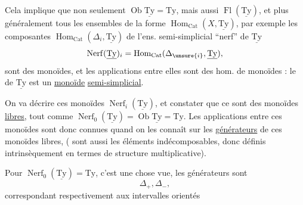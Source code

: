 

Cela implique que non seulement $\operatorname{Ob}\underline{\mathrm{Ty}}=\mathrm{Ty}$, mais aussi $\operatorname{Fl}(\underline{\mathrm{Ty}})$, et plus généralement tous les ensembles  de la forme $\operatorname{Hom}_{\mathrm{Cat}}(X,\underline{\mathrm{Ty}})$,  par exemple les composantes $\operatorname{Hom}_{\mathrm{Cat}}(\Delta_i,\underline{\mathrm{Ty}})$ de l'ens. semi-simplicial ``nerf'' de $\underline{\mathrm{Ty}}$
\[
\operatorname{Nerf}(\underline{\mathrm{Ty}})_i=\operatorname{Hom}_{\mathrm{Cat}}(\Delta_{\unsure{i}},\underline{\mathrm{Ty}}),
\]
sont des monoïdes, et les applications  entre elles sont des hom. de monoïdes : le   de $\underline{\mathrm{Ty}}$ est un \uline{monoïde} \uline{semi-simplicial}.

On va décrire ces monoïdes $\operatorname{Nerf}_i(\underline{\mathrm{Ty}})$, et constater que ce sont  des monoïdes \uline{libres},   tout comme $\operatorname{Nerf}_0(\underline{\mathrm{Ty}})=\operatorname{Ob}\underline{\mathrm{Ty}}=\mathrm{Ty}$. Les applications  entre ces monoïdes sont donc connues quand on les connaît sur les \uline{générateurs} de ces monoïdes libres, ( sont aussi les éléments indécomposables, donc définis intrinsèquement en termes de  structure multiplicative).

Pour $\operatorname{Nerf}_0(\underline{\mathrm{Ty}})=\mathrm{Ty}$, c'est une chose vue, les générateurs sont
\[
\Delta_+,\Delta_-,
\]
correspondant respectivement aux intervalles orientés
